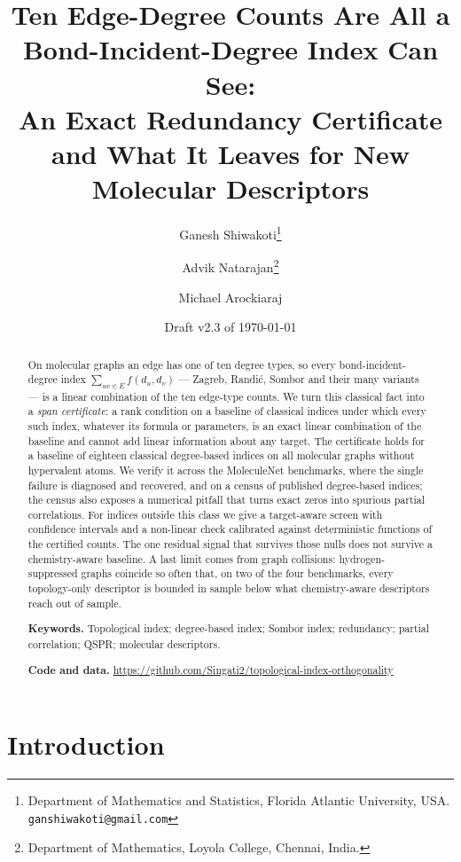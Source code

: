 \documentclass[11pt,a4paper]{article}
\title{\bfseries Ten Edge-Degree Counts Are All a Bond-Incident-Degree Index Can See:\\
An Exact Redundancy Certificate and What It Leaves for New Molecular Descriptors}
\author{
  Ganesh Shiwakoti\thanks{Department of Mathematics and Statistics, Florida Atlantic University, USA. \texttt{ganshiwakoti@gmail.com}} \and
  Advik Natarajan\thanks{Department of Mathematics, Loyola College, Chennai, India.} \and
  Michael Arockiaraj\footnotemark[2]
}
\date{Draft v2.3 of \today}
\theoremstyle{definition}
\begin{document}
\maketitle

\begin{abstract}
On molecular graphs an edge has one of ten degree types, so every
bond-incident-degree index $\sum_{uv\in E} f(d_u,d_v)$ --- Zagreb,
Randi\'c, Sombor and their many variants --- is a linear combination of
the ten edge-type counts. We turn this classical fact into a
\emph{span certificate}: a rank condition on a baseline of classical
indices under which every such index, whatever its formula or
parameters, is an exact linear combination of the baseline and cannot
add linear information about any target. The certificate holds for a
baseline of eighteen classical degree-based indices on all molecular
graphs without hypervalent atoms.
We verify it across the MoleculeNet benchmarks, where the single
failure is diagnosed and recovered, and on a census of published
degree-based indices; the census also exposes a numerical pitfall that
turns exact zeros into spurious partial correlations. For indices
outside this class we give a target-aware screen with confidence
intervals and a non-linear check calibrated against deterministic
functions of the certified counts. The one residual signal that
survives those nulls does not survive a chemistry-aware baseline. A
last limit comes from graph collisions: hydrogen-suppressed graphs
coincide so often that, on two of the four benchmarks, every
topology-only descriptor is bounded in sample below what
chemistry-aware descriptors reach out of sample.

\medskip
\noindent\textbf{Keywords.} Topological index; degree-based index;
Sombor index; redundancy; partial correlation; QSPR; molecular
descriptors.

\medskip
\noindent\textbf{Code and data.}
\url{https://github.com/Singati2/topological-index-orthogonality}
\end{abstract}

\section{Introduction}\label{sec:intro}
\end{document}
